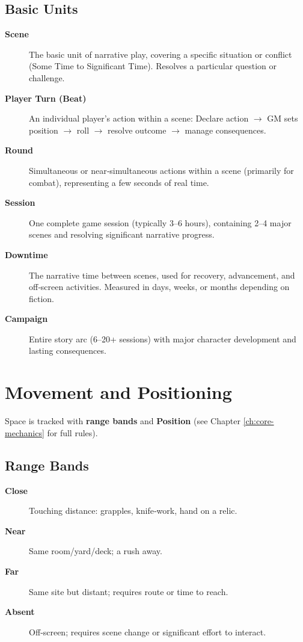 \subsection*{Basic Units}
\label{sec:time-units}
\begin{description}
\item[\textbf{Scene}]  The basic unit of narrative play, covering a specific situation or conflict (Some Time to Significant Time). Resolves a particular question or challenge.
\item[\textbf{Player Turn (Beat)}]  An individual player's action within a scene: Declare action $\rightarrow$ GM sets position $\rightarrow$ roll $\rightarrow$ resolve outcome $\rightarrow$ manage consequences.
\item[\textbf{Round}]  Simultaneous or near‑simultaneous actions within a scene (primarily for combat), representing a few seconds of real time.
\item[\textbf{Session}]  One complete game session (typically 3--6 hours), containing 2--4 major scenes and resolving significant narrative progress.
\item[\textbf{Downtime}]  The narrative time between scenes, used for recovery, advancement, and off‑screen activities. Measured in days, weeks, or months depending on fiction.
\item[\textbf{Campaign}]  Entire story arc (6--20+ sessions) with major character development and lasting consequences.
\end{description}

\section{Movement and Positioning}
\label{sec:movement-positioning}

Space is tracked with \textbf{range bands} and \textbf{Position} (see Chapter \ref{ch:core-mechanics} for full rules).

\subsection*{Range Bands}
\begin{description}
\item[\textbf{Close}]  Touching distance: grapples, knife‑work, hand on a relic.
\item[\textbf{Near}]  Same room/yard/deck; a rush away.
\item[\textbf{Far}]  Same site but distant; requires route or time to reach.
\item[\textbf{Absent}]  Off‑screen; requires scene change or significant effort to interact.
\end{description}

